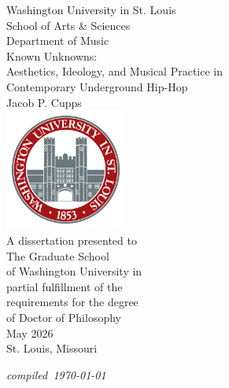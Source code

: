 \begin{titlepage}
    \begin{center}
        \small Washington University in St. Louis \\
                   School of Arts \& Sciences \\
                       Department of Music \\
        \vspace*{1.25in}
        \Large   Known Unknowns: \\
        \vspace{0.1cm}
        \large   Aesthetics, Ideology, and Musical Practice in \\ 
                      Contemporary Underground Hip-Hop \\
        \vspace{0.5cm}
        \normalsize      Jacob P. Cupps \\
        \vfill
        \includegraphics[width=0.3\textwidth]{images/misc/header_logo.png} \\
        \vspace{0.8cm}
        \small A dissertation presented to \\ 
                The Graduate School \\ 
             of Washington University in \\ 
             partial fulfillment of the \\ 
             requirements for the degree \\ 
                 of Doctor of Philosophy \\
        \vspace{0.8cm}
        \normalsize May 2026 \\
        St. Louis, Missouri
    \end{center}
    \vspace*{0.3cm}
    \hfill{\small \textit{compiled~\today}}
\end{titlepage}